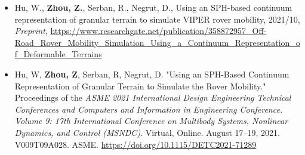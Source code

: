 \begin{footnotesize}
\begin{itemize}[leftmargin=2ex, nosep, noitemsep]
	
	\item {Hu, W., \textbf{Zhou, Z.}, Serban, R., Negrut, D., Using an SPH-based continuum representation of granular terrain to simulate VIPER rover mobility, 2021/10, \textit{Preprint}, \url{https://www.researchgate.net/publication/358872957_Off-Road_Rover_Mobility_Simulation_Using_a_Continuum_Representation_of_Deformable_Terrains}}
	
	
	\item {Hu, W, \textbf{Zhou, Z}, Serban, R, Negrut, D. "Using an SPH-Based Continuum Representation of Granular Terrain to Simulate the Rover Mobility." Proceedings of the \textit{ASME 2021 International Design Engineering Technical Conferences and Computers and Information in Engineering Conference. Volume 9: 17th International Conference on Multibody Systems, Nonlinear Dynamics, and Control (MSNDC)}. Virtual, Online. August 17–19, 2021. V009T09A028. ASME. \url{https://doi.org/10.1115/DETC2021-71289}}

\end{itemize}
	
\end{footnotesize}


